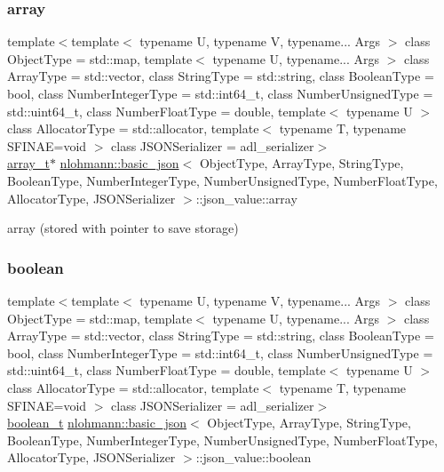\subsubsection{\texorpdfstring{array}{array}}
{\footnotesize\ttfamily template$<$template$<$ typename U, typename V, typename... Args $>$ class Object\+Type = std\+::map, template$<$ typename U, typename... Args $>$ class Array\+Type = std\+::vector, class String\+Type  = std\+::string, class Boolean\+Type  = bool, class Number\+Integer\+Type  = std\+::int64\+\_\+t, class Number\+Unsigned\+Type  = std\+::uint64\+\_\+t, class Number\+Float\+Type  = double, template$<$ typename U $>$ class Allocator\+Type = std\+::allocator, template$<$ typename T, typename S\+F\+I\+N\+A\+E=void $>$ class J\+S\+O\+N\+Serializer = adl\+\_\+serializer$>$ \\
\hyperlink{classnlohmann_1_1basic__json_ae095578e03df97c5b3991787f1056374}{array\+\_\+t}$\ast$ \hyperlink{classnlohmann_1_1basic__json}{nlohmann\+::basic\+\_\+json}$<$ Object\+Type, Array\+Type, String\+Type, Boolean\+Type, Number\+Integer\+Type, Number\+Unsigned\+Type, Number\+Float\+Type, Allocator\+Type, J\+S\+O\+N\+Serializer $>$\+::json\+\_\+value\+::array}



array (stored with pointer to save storage) 

\mbox{\label{unionnlohmann_1_1basic__json_1_1json__value_afd0f8ec00c40301efffd01a276959371}} 
\subsubsection{\texorpdfstring{boolean}{boolean}}
{\footnotesize\ttfamily template$<$template$<$ typename U, typename V, typename... Args $>$ class Object\+Type = std\+::map, template$<$ typename U, typename... Args $>$ class Array\+Type = std\+::vector, class String\+Type  = std\+::string, class Boolean\+Type  = bool, class Number\+Integer\+Type  = std\+::int64\+\_\+t, class Number\+Unsigned\+Type  = std\+::uint64\+\_\+t, class Number\+Float\+Type  = double, template$<$ typename U $>$ class Allocator\+Type = std\+::allocator, template$<$ typename T, typename S\+F\+I\+N\+A\+E=void $>$ class J\+S\+O\+N\+Serializer = adl\+\_\+serializer$>$ \\
\hyperlink{classnlohmann_1_1basic__json_a4c919102a9b4fe0d588af64801436082}{boolean\+\_\+t} \hyperlink{classnlohmann_1_1basic__json}{nlohmann\+::basic\+\_\+json}$<$ Object\+Type, Array\+Type, String\+Type, Boolean\+Type, Number\+Integer\+Type, Number\+Unsigned\+Type, Number\+Float\+Type, Allocator\+Type, J\+S\+O\+N\+Serializer $>$\+::json\+\_\+value\+::boolean}



